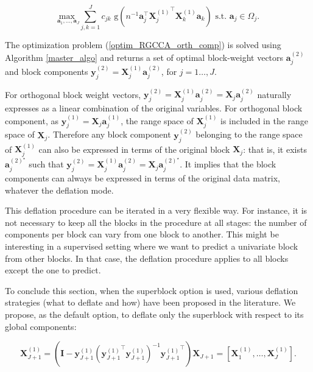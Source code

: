 \documentclass[
]{jss}
\begin{document}
\begin{equation}
        \underset{ \mathbf a_1, \ldots, \mathbf a_J}{\text{max }} \sum_{j, k = 1}^J c_{jk} \text{ g}\left(n^{-1} \mathbf a_j^\top {\mathbf X_j^{(1)}}^\top \mathbf X_k^{(1)}  \mathbf a_k \right)
        \text{ s.t. }  \mathbf a_j \in \Omega_j.
    \label{optim_RGCCA_orth_comp}
\end{equation}

The optimization problem (\ref{optim_RGCCA_orth_comp}) is solved using
Algorithm \ref{master_algo} and returns a set of optimal block-weight
vectors \(\mathbf a_j^{(2)}\) and block components
\(\mathbf y_j^{(2)} = \mathbf X_j^{(1)} \mathbf a_j^{(2)}\), for
\(j = 1\ldots, J\).

For orthogonal block weight vectors,
\(\mathbf y_j^{(2)} = \mathbf X_j^{(1)} \mathbf a_j^{(2)} = \mathbf X_j \mathbf a_j^{(2)}\)
naturally expresses as a linear combination of the original variables.
For orthogonal block component, as
\(\mathbf y_j^{(1)} = \mathbf X_j \mathbf a_j^{(1)}\), the range space
of \(\mathbf X_j^{(1)}\) is included in the range space of
\(\mathbf X_j\). Therefore any block component \(\mathbf y_j^{(2)}\)
belonging to the range space of \(\mathbf X_j^{(1)}\) can also be
expressed in terms of the original block \(\mathbf X_j\): that is, it
exists \(\mathbf a_j^{(2)^\star}\) such that
\(\mathbf y_j^{(2)} = \mathbf X_j^{(1)} \mathbf a_j^{(2)} = \mathbf X_j \mathbf a_j^{(2)^\star}\).
It implies that the block components can always be expressed in terms of
the original data matrix, whatever the deflation mode.

This deflation procedure can be iterated in a very flexible way. For
instance, it is not necessary to keep all the blocks in the procedure at
all stages: the number of components per block can vary from one block
to another. This might be interesting in a supervised setting where we
want to predict a univariate block from other blocks. In that case, the
deflation procedure applies to all blocks except the one to predict.

To conclude this section, when the superblock option is used, various
deflation strategies (what to deflate and how) have been proposed in the
literature. We propose, as the default option, to deflate only the
superblock with respect to its global components:

\[\mathbf X_{J+1}^{(1)} = \left(\mathbf{I} -  \mathbf y_{J+1}^{(1)} \left( { \mathbf y_{J+1}^{(1)}}^\top  \mathbf y_{J+1}^{(1)} \right)^{-1}{ \mathbf y_{J+1}^{(1)}}^\top \right) \mathbf X_{J+1} = \left[ \mathbf X_1^{(1)}, \ldots, \mathbf X_J^{(1)} \right].\]
\end{document}
